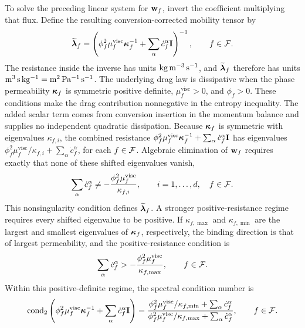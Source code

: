 To solve the preceding linear system for \(\mathbf{w}_f\), invert the coefficient
multiplying that flux.  Define the resulting conversion-corrected mobility
tensor by
%
\begin{equation}
	\widetilde{\boldsymbol{\lambda}}_f
	=
	\left(
		\phi_f^2\mu_f^{\mathrm{visc}}\boldsymbol{\kappa}_f^{-1}
		+\sum_\alpha\dot{c}_f^\alpha\mathbf{I}
	\right)^{-1},
	\qquad
	f\in\mathcal{F} .
	\label{eq:modified_relative_flux_permeability}
\end{equation}
%
The resistance inside the inverse has units
\({\rm kg\,m^{-3}\,s^{-1}}\), and
\(\widetilde{\boldsymbol{\lambda}}_f\) therefore has units
\({\rm m^3\,s\,kg^{-1}}={\rm m^2\,Pa^{-1}\,s^{-1}}\).  The underlying
drag law is dissipative when the phase permeability
\(\boldsymbol{\kappa}_f\) is symmetric positive definite, \(\mu_f^{\mathrm{visc}}>0\), and
\(\phi_f>0\).  These conditions make the drag contribution nonnegative in
the entropy inequality.  The added scalar term comes from conversion insertion
in the momentum balance and supplies no independent quadratic dissipation.
Because \(\boldsymbol{\kappa}_f\) is symmetric with eigenvalues
\(\kappa_{f,i}\), the combined resistance
\(\phi_f^2\mu_f^{\mathrm{visc}}\boldsymbol{\kappa}_f^{-1}
+\sum_\alpha\dot{c}_f^\alpha\mathbf{I}\)
has eigenvalues
\(\phi_f^2\mu_f^{\mathrm{visc}}/\kappa_{f,i}
+\sum_\alpha\dot{c}_f^\alpha\),
for each \(f\in\mathcal{F}\).  Algebraic elimination of \(\mathbf{w}_f\) requires
exactly that none of these shifted eigenvalues vanish,
%
\begin{equation}
	\sum_\alpha\dot{c}_f^\alpha
	\ne
	-\frac{\phi_f^2\mu_f^{\mathrm{visc}}}{\kappa_{f,i}},
	\qquad
	i=1,\ldots,d,\quad f\in\mathcal{F} .
	\label{eq:modified_relative_flux_nonsingularity_condition}
\end{equation}
%
This nonsingularity condition defines \(\widetilde{\boldsymbol{\lambda}}_f\).  A stronger
positive-resistance regime requires every shifted eigenvalue to be positive.
If \(\kappa_{f,\max}\) and \(\kappa_{f,\min}\) are the largest and smallest
eigenvalues of \(\boldsymbol{\kappa}_f\), respectively, the binding direction is that of
largest permeability, and the positive-resistance condition is
%
\begin{equation}
	\sum_\alpha\dot{c}_f^\alpha
	>
	-\frac{\phi_f^2\mu_f^{\mathrm{visc}}}{\kappa_{f,\max}},
	\qquad
	f\in\mathcal{F} .
	\label{eq:modified_relative_flux_positive_resistance_condition}
\end{equation}
%
Within this positive-definite regime, the spectral condition number is
%
\begin{equation}
	\operatorname{cond}_2
	\left(
		\phi_f^2\mu_f^{\mathrm{visc}}\boldsymbol{\kappa}_f^{-1}
		+\sum_\alpha\dot{c}_f^\alpha\mathbf{I}
	\right)
	=
	\frac{
		\phi_f^2\mu_f^{\mathrm{visc}}/\kappa_{f,\min}
		+\sum_\alpha\dot{c}_f^\alpha
	}{
		\phi_f^2\mu_f^{\mathrm{visc}}/\kappa_{f,\max}
		+\sum_\alpha\dot{c}_f^\alpha
	},
	\qquad
	f\in\mathcal{F} .
	\label{eq:modified_relative_flux_condition_number}
\end{equation}
